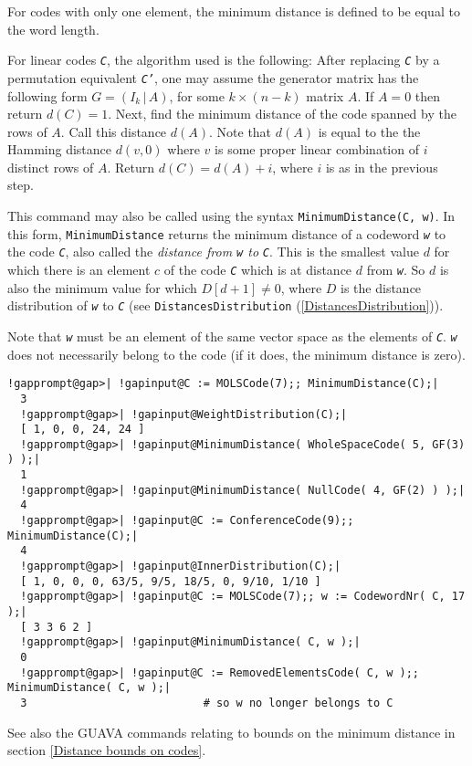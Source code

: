 \documentclass[a4paper,11pt]{report}
\begin{document}
{{{ For codes with only one element, the minimum distance is defined to be equal
to the word length. 

 For linear codes \mbox{\texttt{\mdseries\slshape C}}, the algorithm used is the following: After replacing \mbox{\texttt{\mdseries\slshape C}} by a permutation equivalent \mbox{\texttt{\mdseries\slshape C'}}, one may assume the generator matrix has the following form $G=(I_{k} \, | \, A)$, for some $k\times (n-k)$ matrix $A$. If $A=0$ then return $d(C)=1$. Next, find the minimum distance of the code spanned by the rows of $A$. Call this distance $d(A)$. Note that $d(A)$ is equal to the the Hamming distance $d(v,0)$ where $v$ is some proper linear combination of $i$ distinct rows of $A$. Return $d(C)=d(A)+i$, where $i$ is as in the previous step. 

 This command may also be called using the syntax \texttt{MinimumDistance(C, w)}. In this form, \texttt{MinimumDistance} returns the minimum distance of a codeword \mbox{\texttt{\mdseries\slshape w}} to the code \mbox{\texttt{\mdseries\slshape C}}, also called the \emph{distance from \mbox{\texttt{\mdseries\slshape w}} to} \mbox{\texttt{\mdseries\slshape C}}. This is the smallest value $d$ for which there is an element $c$ of the code \mbox{\texttt{\mdseries\slshape C}} which is at distance $d$ from \mbox{\texttt{\mdseries\slshape w}}. So $d$ is also the minimum value for which $D[d+1] \neq 0$, where $D$ is the distance distribution of \mbox{\texttt{\mdseries\slshape w}} to \mbox{\texttt{\mdseries\slshape C}} (see \texttt{DistancesDistribution} (\ref{DistancesDistribution})). 

 Note that \mbox{\texttt{\mdseries\slshape w}} must be an element of the same vector space as the elements of \mbox{\texttt{\mdseries\slshape C}}. \mbox{\texttt{\mdseries\slshape w}} does not necessarily belong to the code (if it does, the minimum distance is
zero). }

 
\begin{Verbatim}[commandchars=!@|,fontsize=\small,frame=single,label=Example]
  !gapprompt@gap>| !gapinput@C := MOLSCode(7);; MinimumDistance(C);|
  3
  !gapprompt@gap>| !gapinput@WeightDistribution(C);|
  [ 1, 0, 0, 24, 24 ]
  !gapprompt@gap>| !gapinput@MinimumDistance( WholeSpaceCode( 5, GF(3) ) );|
  1
  !gapprompt@gap>| !gapinput@MinimumDistance( NullCode( 4, GF(2) ) );|
  4
  !gapprompt@gap>| !gapinput@C := ConferenceCode(9);; MinimumDistance(C);|
  4
  !gapprompt@gap>| !gapinput@InnerDistribution(C);|
  [ 1, 0, 0, 0, 63/5, 9/5, 18/5, 0, 9/10, 1/10 ] 
  !gapprompt@gap>| !gapinput@C := MOLSCode(7);; w := CodewordNr( C, 17 );|
  [ 3 3 6 2 ]
  !gapprompt@gap>| !gapinput@MinimumDistance( C, w );|
  0
  !gapprompt@gap>| !gapinput@C := RemovedElementsCode( C, w );; MinimumDistance( C, w );|
  3                           # so w no longer belongs to C 
\end{Verbatim}
  See also the \textsf{GUAVA} commands relating to bounds on the minimum distance in section \ref{Distance bounds on codes}. 

}}
\end{document}
